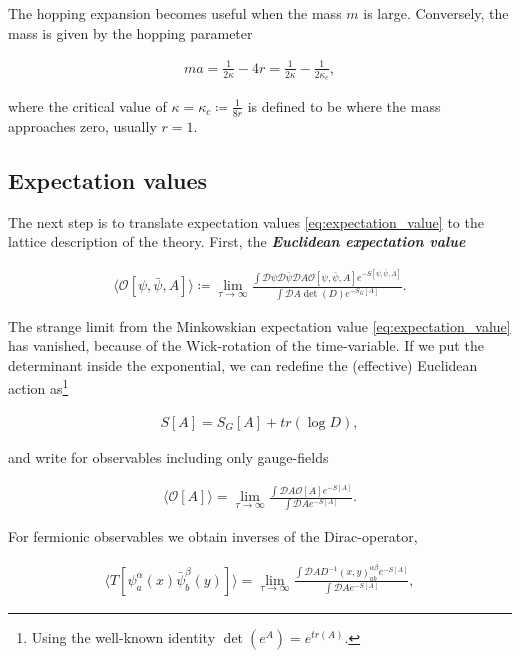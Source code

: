 \documentclass{article}
\theoremstyle{plain} %
\theoremstyle{convention} %
\theoremstyle{remark} %
\def\df#1{\textbf{\textit{#1}}}
\numberwithin{equation}{section}
\begin{document}
The hopping expansion becomes useful when the mass $m$ is large. Conversely, the mass is given by the hopping parameter

\begin{align*}
    m a = \frac{1}{2 \kappa} - 4r = \frac{1}{2 \kappa} - \frac{1}{2 \kappa_c},
\end{align*}

where the critical value of $\kappa = \kappa_c \coloneqq \frac{1}{8r}$ is defined to be where the mass approaches zero, usually $r=1$.

\subsection{Expectation values}

The next step is to translate expectation values \eqref{eq:expectation_value} to the lattice description of the theory. First, the \df{Euclidean expectation value}

\begin{align*}
    \langle \mathcal{O}[\psi, \bar{\psi}, A] \rangle \coloneqq \lim_{\tau \to \infty} \frac{ \int \mathcal{D} \psi \mathcal{D} \bar{\psi} \mathcal{D} A \mathcal{O}[\psi, \bar{\psi}, A] e^{-S[\psi,\bar{\psi},A]} }{ \int \mathcal{D} A \det(D) e^{-S_G[A]} }.
\end{align*}

The strange limit from the Minkowskian expectation value \eqref{eq:expectation_value} has vanished, because of the Wick-rotation of the time-variable. If we put the determinant inside the exponential, we can redefine the (effective) Euclidean action as\footnote{Using the well-known identity $\det(e^A) = e^{tr(A)}$.}

\begin{align}
    S[A] = S_G[A] + tr(\log D), \label{eq:eucl_action}
\end{align}

and write for observables including only gauge-fields

\begin{align*}
    \langle \mathcal{O}[A] \rangle = \lim_{\tau \to \infty} \frac{ \int \mathcal{D} A \mathcal{O}[A] e^{-S[A]} }{ \int \mathcal{D} A e^{-S[A]} }.
\end{align*}

For fermionic observables we obtain inverses of the Dirac-operator,

\begin{align}
    \langle T[\psi^{\alpha}_a(x) \bar{\psi}^{\beta}_b(y)] \rangle = \lim_{\tau \to \infty} \frac{ \int \mathcal{D} A D^{-1}(x,y)^{\alpha \beta}_{a b} e^{-S[A]} }{ \int \mathcal{D} A e^{-S[A]} }, \label{eq:fermion_observables}
\end{align}
\end{document}
